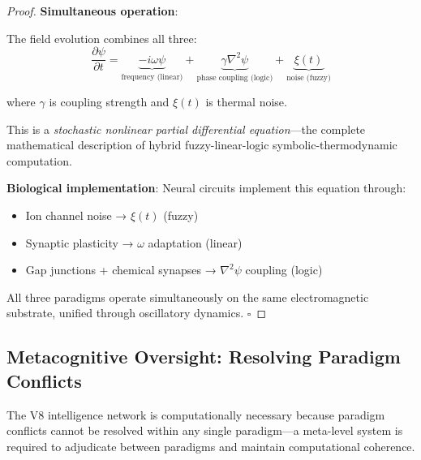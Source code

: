 \begin{proof}
\textbf{Simultaneous operation}:

The field evolution combines all three:
\begin{equation}
\frac{\partial \psi}{\partial t} = \underbrace{-i\omega \psi}_{\text{frequency (linear)}} + \underbrace{\gamma \nabla^2 \psi}_{\text{phase coupling (logic)}} + \underbrace{\xi(t)}_{\text{noise (fuzzy)}}
\end{equation}

where $\gamma$ is coupling strength and $\xi(t)$ is thermal noise.

This is a \textit{stochastic nonlinear partial differential equation}—the complete mathematical description of hybrid fuzzy-linear-logic symbolic-thermodynamic computation.

\textbf{Biological implementation}: Neural circuits implement this equation through:
\begin{itemize}
\item Ion channel noise → $\xi(t)$ (fuzzy)
\item Synaptic plasticity → $\omega$ adaptation (linear)
\item Gap junctions + chemical synapses → $\nabla^2 \psi$ coupling (logic)
\end{itemize}

All three paradigms operate simultaneously on the same electromagnetic substrate, unified through oscillatory dynamics. $\square$
\end{proof}

\subsection{Metacognitive Oversight: Resolving Paradigm Conflicts}

\begin{theorem}
\label{thm:metacognitive_necessity}
The V8 intelligence network is computationally necessary because paradigm conflicts cannot be resolved within any single paradigm—a meta-level system is required to adjudicate between paradigms and maintain computational coherence.
\end{theorem}

